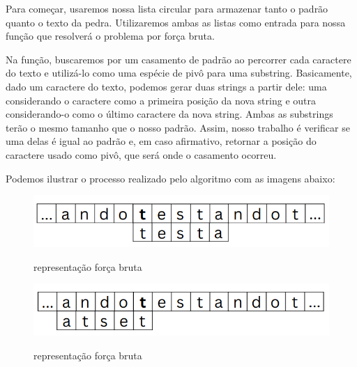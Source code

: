 \documentclass[12pt]{article}
\begin{document}
            Para começar, usaremos nossa lista circular para armazenar tanto o padrão quanto o texto da pedra. 
            Utilizaremos ambas as listas como entrada para nossa função que resolverá o problema por força bruta.
            
            Na função, buscaremos por um casamento de padrão ao percorrer cada caractere do texto e utilizá-lo 
            como uma espécie de pivô para uma substring. Basicamente, dado um caractere do texto, podemos gerar 
            duas strings a partir dele: uma considerando o caractere como a primeira posição da nova string e 
            outra considerando-o como o último caractere da nova string. Ambas as substrings terão o mesmo 
            tamanho que o nosso padrão. Assim, nosso trabalho é verificar se uma delas é igual ao padrão e, em 
            caso afirmativo, retornar a posição do caractere usado como pivô, que será onde o casamento ocorreu.
            
            Podemos ilustrar o processo realizado pelo algoritmo com as imagens abaixo:
            
            \begin{figure}[h]
                \centering
                \includegraphics[width=0.6\linewidth]{Figuras/representacaoForcaBruta1.png}\\
                \caption{representação força bruta}
                \label{fig:ForcaBruta_1}
            \end{figure}

            \begin{figure}[h]
                \centering
                \includegraphics[width=0.6\linewidth]{Figuras/representacaoForcaBruta2.png}\\
                \caption{representação força bruta}
                \label{fig:ForcaBruta_2}
            \end{figure}
\end{document}
